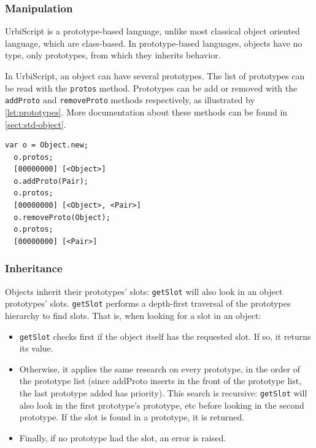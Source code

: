 \documentclass[openright,twoside,12pt]{report}
\newcommand{\us}{UrbiScript\xspace}
\newcommand   {\floatpos}          {htbp}
\newcommand{\lst}[1]{\autoref{lst:#1}}
\newcommand{\sect}[1]{\autoref{sect:#1}}
\begin{document}
\subsubsection{Manipulation}

\us is a prototype-based language, unlike most classical object
oriented language, which are class-based. In prototype-based
languages, objects have no type, only prototypes, from which they
inherits behavior.

In \us, an object can have several prototypes. The list of prototypes
can be read with the \lstinline|protos| method. Prototypes can be add
or removed with the \lstinline|addProto| and \lstinline|removeProto|
methods respectively, as illustrated by \lst{prototypes}. More
documentation about these methods can be found in \sect{std-object}.

\begin{lstlisting}[caption=Manipulating prototypes, label=lst:prototypes,
  float=\floatpos]
  var o = Object.new;
  o.protos;
  [00000000] [<Object>]
  o.addProto(Pair);
  o.protos;
  [00000000] [<Object>, <Pair>]
  o.removeProto(Object);
  o.protos;
  [00000000] [<Pair>]
\end{lstlisting}

\subsubsection{Inheritance}

Objects inherit their prototypes' slots: \lstinline|getSlot| will also
look in an object prototypes' slots. \lstinline|getSlot| performs a
depth-first traversal of the prototypes hierarchy to find slots. That
is, when looking for a slot in an object:

\begin{itemize}
\item \lstinline|getSlot| checks first if the object itself has the
  requested slot. If so, it returns its value.
\item Otherwise, it applies the same research on every prototype, in
  the order of the prototype list (since addProto inserts in the front
  of the prototype list, the last prototype added has priority). This
  search is recursive: \lstinline|getSlot| will also look in the first
  prototype's prototype, etc before looking in the second
  prototype. If the slot is found in a prototype, it is returned.
\item Finally, if no prototype had the slot, an error is raised.
\end{itemize}
\end{document}
